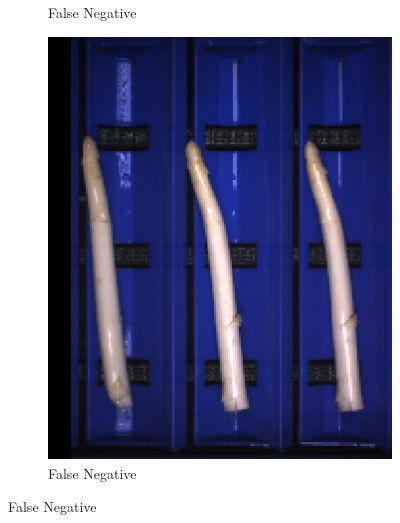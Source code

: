 \begin{figure}[h]
\begin{subfigure}{0.3\textwidth}
		\vspace{-5pt}
		\caption{False Negative}
	\end{subfigure}
	\begin{subfigure}{0.3\textwidth}
		\includegraphics[width=0.9\linewidth]{Figures/appendix/fractured_falsenegative_03.png}
		\vspace{-5pt}
		\caption{False Negative}
	\end{subfigure}


\end{figure}
